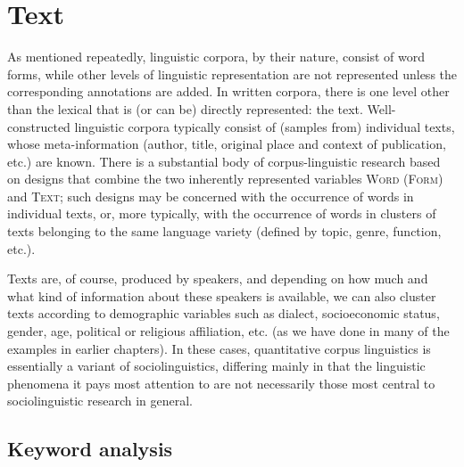\chapter{Text}
\label{ch:text}

As mentioned repeatedly, linguistic corpora, by their nature, consist of word forms, while other levels of linguistic representation are not represented unless the corresponding annotations  are added. In written  corpora, there is one level other than the lexical that is (or can be) directly represented: the text. Well\hyp{}constructed linguistic corpora typically consist of (samples from) individual texts, whose meta\hyp{}information (author, title, original place and context of publication, etc.) are known. There is a substantial body of corpus\hyp{}linguistic research based on designs  that combine the two inherently represented variables \textsc{Word (Form)} and \textsc{Text}; such designs may be concerned with the occurrence of words in individual texts, or, more typically, with the occurrence of words in clusters of texts belonging to the same language variety  (defined by topic, genre,  function, etc.).

Texts are, of course, produced by speakers, and depending on how much and what kind of information about these speakers is available, we can also cluster texts according to demographic  variables such as dialect, socioeconomic status, gender, age,  political or religious affiliation, etc. (as we have done in many of the examples in earlier chapters). In these cases, quantitative  corpus linguistics is essentially a variant of sociolinguistics,  differing mainly in that the linguistic phenomena it pays most attention to are not necessarily those most central to sociolinguistic  research in general.

\section{Keyword analysis}
\label{sec:keywordanalysis}


